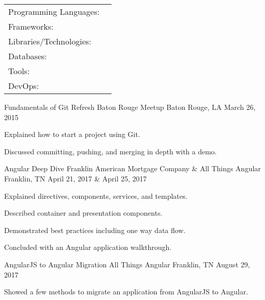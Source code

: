 \documentclass[]{awesome-cv}
\begin{document}
\begin{cventries}
	\cventry
	{}
	{\def\arraystretch{1.15}{\begin{tabular}{ l l }
		Programming Languages:  & {\skill{ JavaScript, Objective-C, Ruby, TypeScript, PHP}} \\
		Frameworks:  & {\skill{ Angular, express.js, iOS, koa, Ruby on Rails, symfony}} \\
		Libraries/Technologies:  & {\skill{ AJAX, jQuery, JSON, knockout.js, Macaroons, ngrx, Observable, Promise, RxJS, window.fetch}} \\
		Databases:  & {\skill{ MongoDB, MySQL, SQL Server}} \\
		Tools:  & {\skill{ Git, babel, webpack}} \\
		DevOps:  & {\skill{ apache, Docker, Kubernetes, Linux, nginx, Passenger, Passenger Enterprise}} \\
		\end{tabular}}}
	{}
	{}
	{}
\end{cventries}
\begin{cventries}
  \cventry
  {Fundamentals of Git}
  {Refresh Baton Rouge Meetup}
  {Baton Rouge, LA}
  {March 26, 2015}
  {
    \begin{cvitems}
      \item {Explained how to start a project using Git.}
      \item {Discussed committing, pushing, and merging in depth with a demo.}
    \end{cvitems}
  }
  \cventry
  {Angular Deep Dive}
  {Franklin American Mortgage Company \& All Things Angular}
  {Franklin, TN}
  {April 21, 2017 \& April 25, 2017}
  {
    \begin{cvitems}
      \item {Explained directives, components, services, and templates.}
      \item {Described container and presentation components.}
      \item {Demonstrated best practices including one way data flow.}
      \item {Concluded with an Angular application walkthrough.}
    \end{cvitems}
  }
  \cventry
  {AngularJS to Angular Migration}
  {All Things Angular}
  {Franklin, TN}
  {August 29, 2017}
  {
    \begin{cvitems}
      \item {Showed a few methods to migrate an application from AngularJS to Angular.}
    \end{cvitems}
  }
\end{cventries}

\vspace{-7mm}


\
\end{document}
